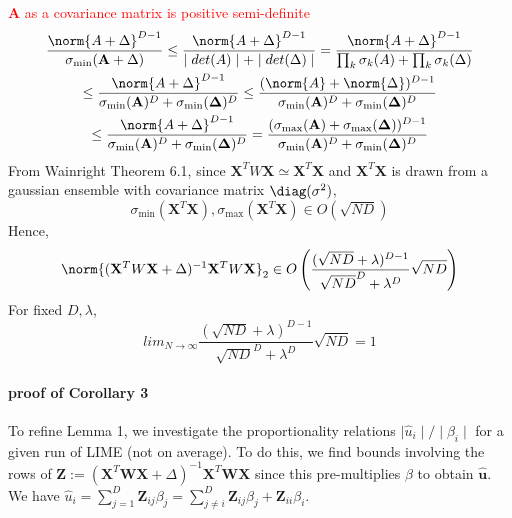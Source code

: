         \textcolor{red}{$\mathbf{A}$ as a covariance matrix is positive semi-definite}
        \begin{gather*}
            \frac{\norm{A + \Delta}^{D-1}}{\sigma_{\min}(\mathbf{A} + \Delta)} \leq \frac{\norm{A + \Delta}^{D-1}}{\mid det(A) \mid + \mid det(\Delta) \mid} = \frac{\norm{A + \Delta}^{D-1}}{\prod_k \sigma_k(A)+ \prod_k \sigma_k(\Delta)} \\
            \leq \frac{\norm{A + \Delta}^{D-1}}{\sigma_{\min}(\mathbf{A})^D+\sigma_{\min}(\mathbf{\Delta})^D} \leq \frac{(\norm{A} + 
            \norm{\Delta})^{D-1}}{\sigma_{\min}(\mathbf{A})^D+\sigma_{\min}(\mathbf{\Delta})^D} \\
            \leq \frac{\norm{A + \Delta}^{D-1}}{\sigma_{\min}(\mathbf{A})^D+\sigma_{\min}(\mathbf{\Delta})^D} = \frac{(\sigma_{\max}(\mathbf{A}) + 
            \sigma_{\max}(\mathbf{\Delta}))^{D-1}}{\sigma_{\min}(\mathbf{A})^D+\sigma_{\min}(\mathbf{\Delta})^D} \\
        \end{gather*}
        From Wainright Theorem 6.1, since $\mathbf{X}^T W \mathbf{X} \simeq \mathbf{X}^T \mathbf{X}$ and $\mathbf{X}^T \mathbf{X}$ is drawn from a gaussian ensemble with covariance matrix $\diag(\sigma^2)$, 
        \begin{equation*}
            \sigma_{\min}(\mathbf{X}^T \mathbf{X}), \sigma_{\max}(\mathbf{X}^T \mathbf{X}) \in O(\sqrt{ND})
        \end{equation*}
        Hence,
        \begin{equation*}
            \norm{(\mathbf{X}^T W \mathbf{X} + \Delta)^{-1}\mathbf{X}^T W \mathbf{X}}_2 \in O\left(\frac{(\sqrt{ND} + \lambda)^{D-1}}{\sqrt{ND}^D+\lambda^D}\sqrt{ND}\right)
        \end{equation*}
        For fixed $D, \lambda$,
        \begin{equation*}
            lim_{N\rightarrow \infty} \frac{(\sqrt{ND} + \lambda)^{D-1}}{\sqrt{ND}^D+\lambda^D}\sqrt{ND} =1 
        \end{equation*}
        
    \paragraph{proof of Corollary 3}
            To refine Lemma 1, we investigate the proportionality relations $\mid\hat{u}_i\mid / \mid \beta_i \mid$ for a given run of LIME (not on average). To do this, we find bounds involving the rows of %
            $\mathbf{Z} := (\mathbf{X}^T\mathbf{W}\mathbf{X} + \Delta)^{-1}\mathbf{X}^T\mathbf{W}\mathbf{X}$
            since this pre-multiplies $\beta$ to obtain $\hat{\mathbf{u}}$. We have $\hat{u}_i = \sum_{j=1}^D\mathbf{Z}_{ij}\beta_j = \sum_{j\neq i}^D\mathbf{Z}_{ij}\beta_j + \mathbf{Z}_{ii}\beta_i$. 

